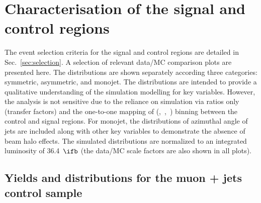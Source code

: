 \section{Characterisation of the signal and control regions}
\label{sec:yields}

The event selection criteria for the signal and control regions are
detailed in Sec.~\ref{sec:selection}. A selection of relevant data/MC
comparison plots are presented here. The distributions are shown
separately according three \njet categories: symmetric, asymmetric,
and monojet. The distributions are intended to provide a qualitative
understanding of the simulation modelling for key variables. However, 
the analysis is not sensitive due to the reliance on simulation via
ratios only (\ie transfer factors) and the one-to-one mapping of
(\njet,~\nb,~\scalht) binning between the control and signal
regions. For monojet, the distributions of azimuthal angle of jets are 
included along with other key variables to demonstrate the absence of 
beam halo effects. The simulated distributions are normalized to an integrated
luminosity of 36.4~$\ifb$ (the data/MC scale factors are also shown
in all plots).


%
%
%
%

\newpage
\subsection{Yields and distributions for the muon + jets control sample}

